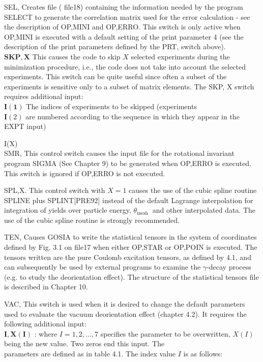 \documentclass[10pt]{article}
\begin{document}
SEL, Creates file ( file18) containing the information needed by the program SELECT to generate the correlation matrix used for the error calculation - see the description of OP,MINI and OP,ERRO. This switch is only active when OP,MINI is executed with a default setting of the print parameter 4 (see the description of the print parameters defined by the PRT, switch above).\\
$\mathbf{S K P}, \mathbf{X}$ This causes the code to skip $X$ selected experiments during the minimization procedure, i.e., the code does not take into account the selected experiments. This switch can be quite useful since often a subset of the experiments is sensitive only to a subset of matrix elements. The SKP, X switch requires additional input:\\
$\mathbf{I}(\mathbf{1})$ The indices of experiments to be skipped (experiments\\
$\mathbf{I}(2)$ are numbered according to the sequence in which they appear in the EXPT input)

I(X)\\
SMR, This control switch causes the input file for the rotational invariant program SIGMA (See Chapter 9) to be generated when OP,ERRO is executed. This switch is ignored if OP,ERRO is not executed.

SPL,X. This control switch with $X=1$ causes the use of the cubic spline routine SPLINE plus SPLINT[PRE92] instead of the default Lagrange interpolation for integration of yields over particle energy, $\theta_{\text {mesh }}$ and other interpolated data. The use of the cubic spline routine is strongly recommended.

TEN, Causes GOSIA to write the statistical tensors in the system of coordinates defined by Fig. 3.1 on file17 when either OP,STAR or OP,POIN is executed. The tensors written are the pure Coulomb excitation tensors, as defined by 4.1, and can subsequently be used by external programs to examine the $\gamma$-decay process (e.g. to study the deorientation effect). The structure of the statistical tensors file is described in Chapter 10.

VAC, This switch is used when it is desired to change the default parameters used to evaluate the vacuum deorientation effect (chapter 4.2). It requires the following additional input:\\
$\mathbf{I}, \mathbf{X}(\mathbf{I})$ : where $I=1,2, \ldots, 7$ specifies the parameter to be overwritten, $X(I)$ being the new value. Two zeros end this input. The\\
parameters are defined as in table 4.1. The index value $I$ is as follows:
\end{document}
